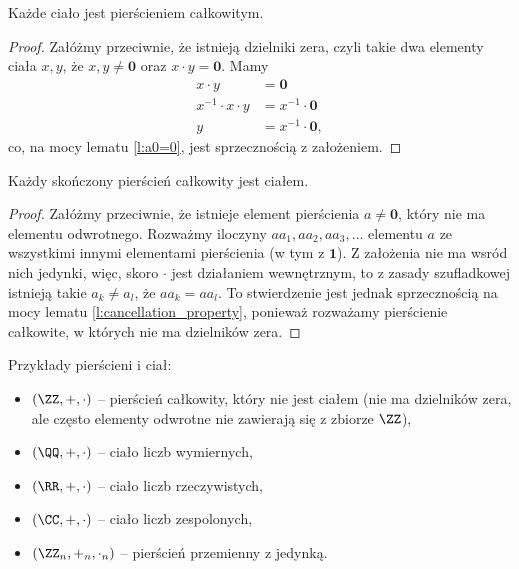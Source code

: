 \begin{theorem}
    Każde ciało jest pierścieniem całkowitym.
\end{theorem}
\begin{proof}
    Załóżmy przeciwnie, że istnieją dzielniki zera, czyli takie dwa elementy ciała $x, y$, że $x, y \neq \mathbf{0}$ oraz $x \cdot y = \mathbf{0}$. Mamy
    \begin{align*}
        x \cdot y &= \mathbf{0} \\
        x^{-1} \cdot x \cdot y &= x^{-1} \cdot \mathbf{0} \\
        y &= x^{-1} \cdot \mathbf{0},
    \end{align*}
    co, na mocy lematu \ref{l:a0=0}, jest sprzecznością z założeniem.
\end{proof}

\begin{theorem}
    Każdy skończony pierścień całkowity jest ciałem.
\end{theorem}
\begin{proof}
    Załóżmy przeciwnie, że istnieje element pierścienia $a \neq \mathbf{0}$, który nie ma elementu odwrotnego. Rozważmy iloczyny $aa_1, aa_2, aa_3, \ldots$ elementu $a$ ze wszystkimi innymi elementami pierścienia (w tym z $\mathbf{1}$). Z założenia nie ma wsród nich jedynki, więc, skoro $\cdot$ jest działaniem wewnętrznym, to z zasady szufladkowej istnieją takie $a_k \neq a_l$, że $aa_k = aa_l$. To stwierdzenie jest jednak sprzecznością na mocy lematu \ref{l:cancellation_property}, ponieważ rozważamy pierścienie całkowite, w których nie ma dzielników zera.
\end{proof}

\begin{example}
    Przykłady pierścieni i ciał:
    \begin{itemize}
        \item $(\ZZ, +, \cdot)$ -- pierścień całkowity, który nie jest ciałem (nie ma dzielników zera, ale często elementy odwrotne nie zawierają się z zbiorze $\ZZ$),
        \item $(\QQ, +, \cdot)$ -- ciało liczb wymiernych,
        \item $(\RR, +, \cdot)$ -- ciało liczb rzeczywistych,
        \item $(\CC, +, \cdot)$ -- ciało liczb zespolonych,
        \item $(\ZZ_n, +_n, \cdot_n)$ -- pierścień przemienny z jedynką.
    \end{itemize}
\end{example}

